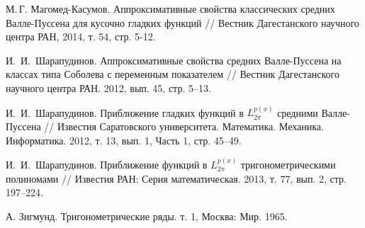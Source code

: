  М.\,Г. Магомед-Касумов. Аппроксимативные свойства классических средних Валле-Пуссена для кусочно гладких функций
// Вестник Дагестанского научного центра РАН, 2014, т. 54, стр. 5-12.






 И. \,И.~Шарапудинов. Аппроксимативные свойства средних Валле-Пуссена на классах типа Соболева с переменным показателем // Вестник Дагестанского научного центра РАН. 2012, вып. 45, стр. 5–13.

 И. \,И.~Шарапудинов.  Приближение гладких функций в  $L_{2\pi}^{p(x)}$ средними Валле-Пуссена // Известия Саратовского университета. Математика. Механика. Информатика. 2012, т. 13, вып.  1, Часть 1, стр. 45–49.




 И. \,И.~Шарапудинов. Приближение функций в $L^{p(x)}_{2\pi}$ тригонометрическими полиномами // Известия РАН: Серия математическая. 2013, т. 77, вып. 2, стр. 197–224.




 А. Зигмунд. Тригонометрические ряды. т. 1, Москва: Мир. 1965.

